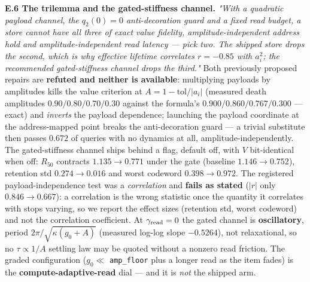 \documentclass{article}
\begin{document}
\textbf{E.6 The trilemma and the gated-stiffness channel.} \emph{"With a quadratic payload channel, the $q_2(0)=0$ anti-decoration guard and a fixed read budget, a store cannot have all three of exact value fidelity, amplitude-independent address hold and amplitude-independent read latency --- pick two. The shipped store drops the second, which is why effective lifetime correlates $r=-0.85$ with $a_i^2$; the recommended gated-stiffness channel drops the third."} Both previously proposed repairs are \textbf{refuted and neither is available}: multiplying payloads by amplitudes kills the value criterion at $A=1-\text{tol}/|a_i|$ (measured death amplitudes $0.90/0.80/0.70/0.30$ against the formula's $0.900/0.860/0.767/0.300$ --- exact) and \emph{inverts} the payload dependence; launching the payload coordinate at the address-mapped point breaks the anti-decoration guard --- a trivial substitute then passes $0.672$ of queries with no dynamics at all, amplitude-independently. The gated-stiffness channel ships behind a flag, default off, with $V$ bit-identical when off: $R_{50}$ contracts $1.135\to0.771$ under the gate (baseline $1.146\to0.752$), retention std $0.274\to0.016$ and worst codeword $0.398\to0.972$. The registered payload-independence test was a \emph{correlation} and \textbf{fails as stated} ($|r|$ only $0.846\to0.667$): a correlation is the wrong statistic once the quantity it correlates with stops varying, so we report the effect sizes (retention std, worst codeword) and not the correlation coefficient. At $\gamma_{\rm read}=0$ the gated channel is \textbf{oscillatory}, period $2\pi/\sqrt{\kappa(g_0+A)}$ (measured log-log slope $-0.5264$), not relaxational, so no $\tau\propto1/A$ settling law may be quoted without a nonzero read friction. The graded configuration ($g_0\ll$ \texttt{amp\_floor} plus a longer read as the item fades) is the \textbf{compute-adaptive-read} dial --- and it is \emph{not} the shipped arm.
\end{document}
